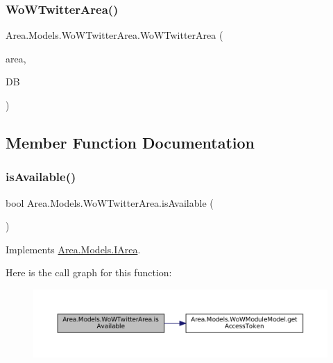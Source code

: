 \subsubsection{\texorpdfstring{Wo\+W\+Twitter\+Area()}{WoWTwitterArea()}}
{\footnotesize\ttfamily Area.\+Models.\+Wo\+W\+Twitter\+Area.\+Wo\+W\+Twitter\+Area (\begin{DoxyParamCaption}\item[{\mbox{\hyperlink{classArea_1_1Models_1_1AREA}{A\+R\+EA}}}]{area,  }\item[{\mbox{\hyperlink{classArea_1_1DAT_1_1AreaDbContext}{Area\+Db\+Context}}}]{DB }\end{DoxyParamCaption})\hspace{0.3cm}{\ttfamily [inline]}}



\subsection{Member Function Documentation}
\mbox{\label{classArea_1_1Models_1_1WoWTwitterArea_af69bc0b27a27e86935da99d750d80f17}} 
\subsubsection{\texorpdfstring{is\+Available()}{isAvailable()}}
{\footnotesize\ttfamily bool Area.\+Models.\+Wo\+W\+Twitter\+Area.\+is\+Available (\begin{DoxyParamCaption}{ }\end{DoxyParamCaption})\hspace{0.3cm}{\ttfamily [inline]}}



Implements \mbox{\hyperlink{interfaceArea_1_1Models_1_1IArea_a742b324f0d7573f7f99f9e2adb5df94c}{Area.\+Models.\+I\+Area}}.

Here is the call graph for this function\+:
\nopagebreak
\begin{figure}[H]
\begin{center}
\leavevmode
\includegraphics[width=350pt]{classArea_1_1Models_1_1WoWTwitterArea_af69bc0b27a27e86935da99d750d80f17_cgraph}
\end{center}
\end{figure}
\mbox{\label{classArea_1_1Models_1_1WoWTwitterArea_a56856ed9dc553111f0c5db1a4813f565}} 
